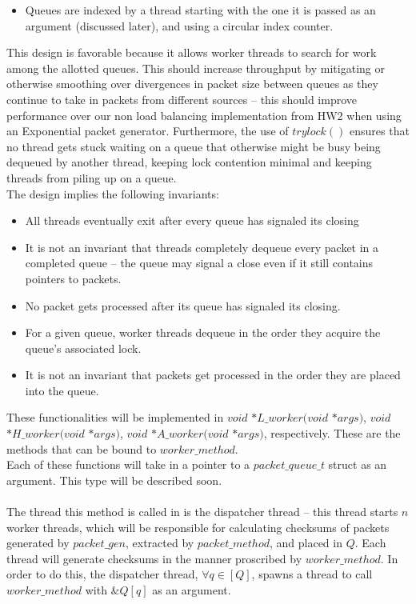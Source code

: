 \documentclass[]{article}
\begin{document}
\begin{itemize}
\begin{itemize}
\begin{itemize}
\begin{itemize}
				\item Queues are indexed by a thread starting with the one it is passed as an argument (discussed later), and using a circular index counter.
			\end{itemize}
			This design is favorable because it allows worker threads to search for work among the allotted queues. This should increase throughput by mitigating or otherwise smoothing over divergences in packet size between queues as they continue to take in packets from different sources -- this should improve performance over our non load balancing implementation from HW2 when using an Exponential packet generator. Furthermore, the use of $trylock()$ ensures that no thread gets stuck waiting on a queue that otherwise might be busy being dequeued by another thread, keeping lock contention minimal and keeping threads from piling up on a queue.
			\\
			The design implies the following invariants:
			\begin{itemize}
				\item All threads eventually exit after every queue has signaled its closing
				\item It is not an invariant that threads completely dequeue every packet in a completed queue -- the queue may signal a close even if it still contains pointers to packets.
				\item No packet gets processed after its queue has signaled its closing.
				\item For a given queue, worker threads dequeue in the order they acquire the queue's associated lock.
				\item It is not an invariant that packets get processed in the order they are placed into the queue.
			\end{itemize}
		\end{itemize}
		These functionalities will be implemented in $void$ $*L\_worker(void$ $*args)$, $void$ $*H\_worker(void$ $*args)$, $void$ $*A\_worker(void$ $*args)$, respectively. These are the methods that can be bound to $worker\_method$.
		\\
		Each of these functions will take in a pointer to a $packet\_queue\_t$ struct as an argument. This type will be described soon.
		\\\\
		The thread this method is called in is the dispatcher thread -- this thread starts $n$ worker threads, which will be responsible for calculating checksums of packets generated by  $packet\_gen$, extracted by $packet\_method$, and placed in $Q$. Each thread will generate checksums in the manner proscribed by $worker\_method$. In order to do this, the dispatcher thread, $\forall q \in [Q]$, spawns a thread to call $worker\_method$ with $\&Q[q]$ as an argument.

\end{itemize}
\end{itemize}
\end{document}
